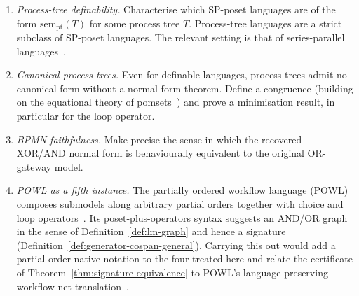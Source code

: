 \begin{enumerate}
  \item \emph{Process-tree definability.} Characterise which SP-poset languages are of the form
    $\mathrm{sem}_{\mathrm{pt}}(T)$ for some process tree $T$. Process-tree languages are a strict
    subclass of SP-poset languages. The relevant setting is that of series-parallel
    languages~\cite{lodayaSeriesParallelLanguages2000}.
  \item \emph{Canonical process trees.} Even for definable languages, process trees admit no
    canonical form without a normal-form theorem. Define a congruence (building on the equational
    theory of pomsets~\cite{gischerEquationalTheoryPomsets1988}) and prove a minimisation result, in
    particular for the loop operator.
  \item \emph{BPMN faithfulness.} Make precise the sense in which the recovered XOR/AND normal form
    is behaviourally equivalent to the original OR-gateway model.
  \item \emph{POWL as a fifth instance.} The partially ordered workflow language (POWL) composes submodels along arbitrary partial
    orders together with choice and loop operators~\cite{kouraniPOWLPartiallyOrdered2023}. Its
    poset-plus-operators syntax suggests an AND/OR graph in the sense of
    Definition~\ref{def:lm-graph} and hence a signature
    (Definition~\ref{def:generator-cospan-general}). Carrying this out would add a
    partial-order-native notation to the four treated here and relate the certificate of
    Theorem~\ref{thm:signature-equivalence} to POWL's language-preserving workflow-net
    translation~\cite{kouraniTranslatingWorkflowNets2025}.
\end{enumerate}
